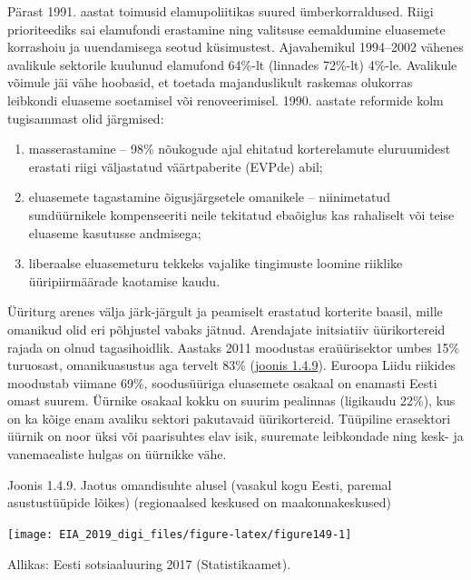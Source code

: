 \documentclass[estonian,]{article}
\providecommand{\tightlist}{%
  \setlength{\itemsep}{0pt}\setlength{\parskip}{0pt}}
\begin{document}
Pärast 1991. aastat toimusid elamupoliitikas suured ümberkorraldused. Riigi prioriteediks sai elamufondi erastamine ning valitsuse eemaldumine eluasemete korrashoiu ja uuendamisega seotud küsimustest. Ajavahemikul 1994--2002 vähenes avalikule sektorile kuulunud elamufond 64\%-lt (linnades 72\%-lt) 4\%-le. Avalikule võimule jäi vähe hoobasid, et toetada majanduslikult raskemas olukorras leibkondi eluaseme soetamisel või renoveerimisel. 1990. aastate reformide kolm tugisammast olid järgmised:

\begin{enumerate}
\def\labelenumi{\arabic{enumi})}
\tightlist
\item
  masserastamine -- 98\% nõukogude ajal ehitatud korterelamute eluruumidest erastati riigi väljastatud väärtpaberite (EVPde) abil;
\item
  eluasemete tagastamine õigusjärgsetele omanikele -- niinimetatud sundüürnikele kompenseeriti neile tekitatud ebaõiglus kas rahaliselt või teise eluaseme kasutusse andmisega;
\item
  liberaalse eluasemeturu tekkeks vajalike tingimuste loomine riiklike üüripiirmäärade kaotamise kaudu.
\end{enumerate}

Üüriturg arenes välja järk-järgult ja peamiselt erastatud korterite baasil, mille omanikud olid eri põhjustel vabaks jätnud. Arendajate initsiatiiv üürikortereid rajada on olnud tagasihoidlik. Aastaks 2011 moodustas eraüürisektor umbes 15\% turuosast, omanikuasustus aga tervelt 83\% (\protect\hyperlink{figure149}{joonis 1.4.9}). Euroopa Liidu riikides moodustab viimane 69\%, soodusüüriga eluasemete osakaal on enamasti Eesti omast suurem. Üürnike osakaal kokku on suurim pealinnas (ligikaudu 22\%), kus on ka kõige enam avaliku sektori pakutavaid üürikortereid. Tüüpiline erasektori üürnik on noor üksi või paarisuhtes elav isik, suuremate leibkondade ning kesk- ja vanemaealiste hulgas on üürnikke vähe.

{Joonis 1.4.9.} Jaotus omandisuhte alusel (vasakul kogu Eesti, paremal asustustüüpide lõikes) (regionaalsed keskused on maakonnakeskused)

\begin{center}\texttt{[image: EIA\_2019\_digi\_files/figure-latex/figure149-1]} \end{center}

\begin{imgsource}
{Allikas:} Eesti sotsiaaluuring 2017 (Statistikaamet).
\end{imgsource}
\end{document}
